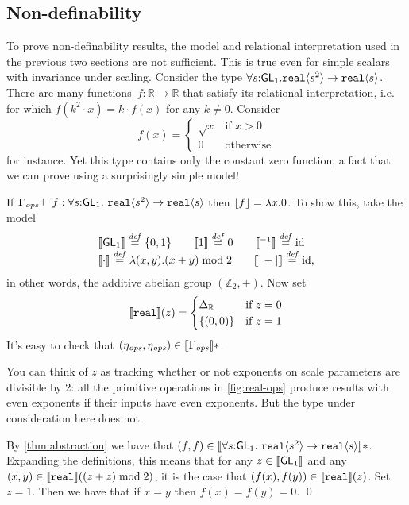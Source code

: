 \subsection{Non-definability}
\label{sec:types-indexed-abelian-groups-indef}

\newcommand{\Grp}{\mathit{Gr}}
To prove non-definability results, the model and relational interpretation
used in the previous two sections are not sufficient.
This is true even for simple scalars with invariance under scaling.
Consider the type 
$\forall s \mathord: \mathsf{GL}_1.\textup{\texttt{real}}\langle s^2 \rangle \to \textup{\texttt{real}}\langle s \rangle$. 
There are many functions~$f: \mathbb R \to \mathbb R$
that satisfy its relational interpretation, i.e. for which $f(k^2\cdot x) = k\cdot f(x)$ for 
any $k\neq 0$.
Consider 
\[
f(x) = \begin{cases}\sqrt x & \text{if }x > 0\\0&\text{otherwise}\end{cases}
\]
for instance. Yet this type contains only the constant zero function, a fact that
we can prove using a surprisingly simple model!

\begin{example}\label{ex:sqrt-root-nondef}
If  $\Gamma_{\mathit{ops}} \vdash f : \forall s \mathord: \mathsf{GL}_1.\
\textup{\texttt{real}}\langle s^2 \rangle \to \textup{\texttt{real}}\langle s \rangle$ 
then $\left\lfloor{f}\right\rfloor = \lambda x.0$.
To show this, take the model
\[
\begin{array}{l}
\llbracket \mathsf{GL}_1 \rrbracket \stackrel{\mathit{def}}= \{0,1\}\qquad
\llbracket 1 \rrbracket \stackrel{\mathit{def}}= 0 \qquad
\llbracket {}^{-1} \rrbracket  \stackrel{\mathit{def}}= \mathrm{id}\\
\llbracket \cdot \rrbracket \stackrel{\mathit{def}}= \lambda(x,y).(x+y)\mathrel{\mathrm{mod}} 2
\qquad
\llbracket |-| \rrbracket \stackrel{\mathit{def}}= \mathrm{id},

\end{array}
\]
in other words, the additive abelian group $(\mathbb Z_2, +)$. 
Now set
\[
\llbracket \textup{\texttt{real}} \rrbracket(z) = 
  \begin{cases} \Delta_{\mathbb R} & \text{if }z=0\\
                      \{(0,0)\} & \text{if }z=1
\end{cases}
\]
It's easy to check that $(\eta_{\mathit{ops}},\eta_{\mathit{ops}})\in\llbracket \Gamma_{\mathit{ops}} \rrbracket*$.

You can think of $z$ as tracking whether or not exponents on scale
parameters are divisible by 2: all the primitive operations in
\autoref{fig:real-ops} produce results with even exponents if their
inputs have even exponents. But the type under consideration here does
not.

By \autoref{thm:abstraction} we have that $(f,f)\in\llbracket \forall s
  \mathord: \mathsf{GL}_1.\ \textup{\texttt{real}}\langle s^2 \rangle \to \textup{\texttt{real}}\langle s \rangle \rrbracket *$.
Expanding the definitions, this means that for any
$z\in\llbracket \mathsf{GL}_1 \rrbracket$ and any
$(x,y)\in\llbracket \textup{\texttt{real}} \rrbracket((z+z)\mathrel\textrm{mod}2)$, it is the case that
$(f(x),f(y))\in\llbracket \textup{\texttt{real}} \rrbracket(z)$. Set $z = 1$.  
Then we have that if $x=y$ then $f(x)=f(y)=0$.
\qed
\end{example}

